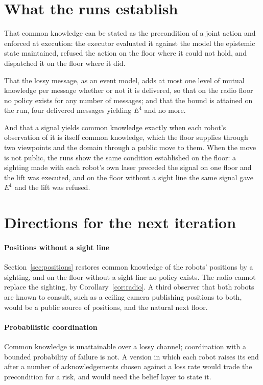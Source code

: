 \documentclass[11pt,a4paper]{article}
\theoremstyle{definition}
\begin{document}
\section{What the runs establish}
\label{sec:established}

That common knowledge can be stated as the precondition of a joint action and
enforced at execution: the executor evaluated it against the model the
epistemic state maintained, refused the action on the floor where it could not
hold, and dispatched it on the floor where it did.

That the lossy message, as an event model, adds at most one level of mutual
knowledge per message whether or not it is delivered, so that on the radio floor
no policy exists for any number of messages; and that the bound is attained on
the run, four delivered messages yielding $E^4$ and no more.

And that a signal yields common knowledge exactly when each robot's observation
of it is itself common knowledge, which the floor supplies through two
viewpoints and the domain through a public move to them. When the move is not
public, the runs show the same condition established on the floor: a sighting
made with each robot's own laser preceded the signal on one floor and the lift
was executed, and on the floor without a sight line the same signal gave $E^1$
and the lift was refused.

\section{Directions for the next iteration}
\label{sec:next}

\paragraph{Positions without a sight line} Section~\ref{sec:positions} restores
common knowledge of the robots' positions by a sighting, and on the floor
without a sight line no policy exists. The radio cannot replace the sighting,
by Corollary~\ref{cor:radio}. A third observer that both robots are known to
consult, such as a ceiling camera publishing positions to both, would be a
public source of positions, and the natural next floor.

\paragraph{Probabilistic coordination} Common knowledge is unattainable over a
lossy channel; coordination with a bounded probability of failure is not. A
version in which each robot raises its end after a number of acknowledgements
chosen against a loss rate would trade the precondition for a risk, and would
need the belief layer to state it.
\end{document}
